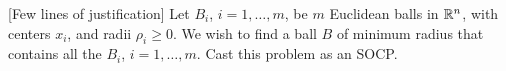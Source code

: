 
{[Few lines of justification]} Let $B_i$, $i=1,\ldots,m$, be $m$ Euclidean balls in $\mathbb{R}^{n}$, with centers $x_i$, and radii
$\rho_i\geq 0$. We wish to find a ball $B$ of minimum radius that contains all the $B_i$, $i=1,\ldots,m$.
Cast this problem as an SOCP.

\sol{}